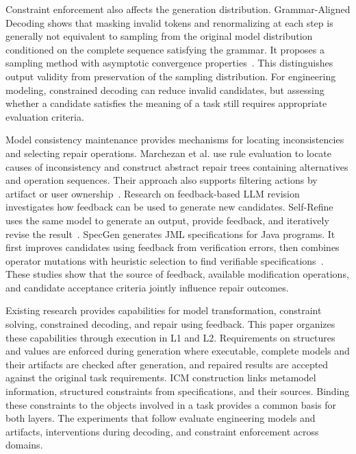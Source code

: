 \documentclass[pdflatex,iicol,sn-mathphys-num]{sn-jnl}
\newcommand{\paperref}[1]{~\citep{#1}}
\begin{document}
Constraint enforcement also affects the generation distribution. Grammar-Aligned Decoding shows that masking invalid tokens and renormalizing at each step is generally not equivalent to sampling from the original model distribution conditioned on the complete sequence satisfying the grammar. It proposes a sampling method with asymptotic convergence properties\paperref{NEURIPS2024_2bdc2267}. This distinguishes output validity from preservation of the sampling distribution. For engineering modeling, constrained decoding can reduce invalid candidates, but assessing whether a candidate satisfies the meaning of a task still requires appropriate evaluation criteria.

Model consistency maintenance provides mechanisms for locating inconsistencies and selecting repair operations. Marchezan et al. use rule evaluation to locate causes of inconsistency and construct abstract repair trees containing alternatives and operation sequences. Their approach also supports filtering actions by artifact or user ownership\paperref{Marchezan2023}. Research on feedback-based LLM revision investigates how feedback can be used to generate new candidates. Self-Refine uses the same model to generate an output, provide feedback, and iteratively revise the result\paperref{NEURIPS2023_91edff07}. SpecGen generates JML specifications for Java programs. It first improves candidates using feedback from verification errors, then combines operator mutations with heuristic selection to find verifiable specifications\paperref{Ma_2025b}. These studies show that the source of feedback, available modification operations, and candidate acceptance criteria jointly influence repair outcomes.

Existing research provides capabilities for model transformation, constraint solving, constrained decoding, and repair using feedback. This paper organizes these capabilities through execution in L1 and L2. Requirements on structures and values are enforced during generation where executable, complete models and their artifacts are checked after generation, and repaired results are accepted against the original task requirements. ICM construction links metamodel information, structured constraints from specifications, and their sources. Binding these constraints to the objects involved in a task provides a common basis for both layers. The experiments that follow evaluate engineering models and artifacts, interventions during decoding, and constraint enforcement across domains.

\FloatBarrier
\end{document}
